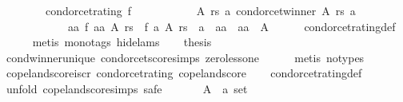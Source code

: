 \begin{isabellebody}
\ \ \ \ \ \ \ \ {\isacharparenleft}{\kern0pt}condorcet{\isacharunderscore}{\kern0pt}rating\ f\ {\isasymlongrightarrow}\isanewline
\ \ \ \ \ \ \ \ \ \ {\isacharparenleft}{\kern0pt}{\isasymforall}A\ rs\ a{\isachardot}{\kern0pt}\ condorcet{\isacharunderscore}{\kern0pt}winner\ A\ rs\ a\ {\isasymlongrightarrow}\isanewline
\ \ \ \ \ \ \ \ \ \ \ \ {\isacharparenleft}{\kern0pt}{\isasymforall}aa{\isachardot}{\kern0pt}\ f\ aa\ A\ rs\ {\isacharless}{\kern0pt}\ f\ a\ A\ rs\ {\isasymor}\ a\ {\isacharequal}{\kern0pt}\ aa\ {\isasymor}\ aa\ {\isasymnotin}\ A{\isacharparenright}{\kern0pt}{\isacharparenright}{\kern0pt}{\isacharparenright}{\kern0pt}{\isachardoublequoteclose}\isanewline
\ \ \ \ \isamarkupfalse%
\ condorcet{\isacharunderscore}{\kern0pt}rating{\isacharunderscore}{\kern0pt}def\isanewline
\ \ \ \ \isamarkupfalse%
\ {\isacharparenleft}{\kern0pt}metis\ {\isacharparenleft}{\kern0pt}mono{\isacharunderscore}{\kern0pt}tags{\isacharcomma}{\kern0pt}\ hide{\isacharunderscore}{\kern0pt}lams{\isacharparenright}{\kern0pt}{\isacharparenright}{\kern0pt}\isanewline
\ \ \isamarkupfalse%
\ {\isacharquery}{\kern0pt}thesis\isanewline
\ \ \ \ \isamarkupfalse%
\ cond{\isacharunderscore}{\kern0pt}winner{\isacharunderscore}{\kern0pt}unique\ condorcet{\isacharunderscore}{\kern0pt}score{\isachardot}{\kern0pt}simps\ zero{\isacharunderscore}{\kern0pt}less{\isacharunderscore}{\kern0pt}one\isanewline
\ \ \ \ \isamarkupfalse%
\ {\isacharparenleft}{\kern0pt}metis\ {\isacharparenleft}{\kern0pt}no{\isacharunderscore}{\kern0pt}types{\isacharparenright}{\kern0pt}{\isacharparenright}{\kern0pt}\isanewline
{}\isamarkupfalse%
%
\endisatagproof
{\isafoldproof}%
%
\isadelimproof
\isanewline
%
\endisadelimproof
\isanewline
\isanewline
{}\isamarkupfalse%
\ copeland{\isacharunderscore}{\kern0pt}score{\isacharunderscore}{\kern0pt}is{\isacharunderscore}{\kern0pt}cr{\isacharcolon}{\kern0pt}\ {\isachardoublequoteopen}condorcet{\isacharunderscore}{\kern0pt}rating\ copeland{\isacharunderscore}{\kern0pt}score{\isachardoublequoteclose}\isanewline
%
\isadelimproof
\ \ %
\endisadelimproof
%
\isatagproof
{}\isamarkupfalse%
\ condorcet{\isacharunderscore}{\kern0pt}rating{\isacharunderscore}{\kern0pt}def\isanewline
{}\isamarkupfalse%
\ {\isacharparenleft}{\kern0pt}unfold\ copeland{\isacharunderscore}{\kern0pt}score{\isachardot}{\kern0pt}simps{\isacharcomma}{\kern0pt}\ safe{\isacharparenright}{\kern0pt}\isanewline
\ \ \isamarkupfalse%
\isanewline
\ \ \ \ A\ {\isacharcolon}{\kern0pt}{\isacharcolon}{\kern0pt}\ {\isachardoublequoteopen}{\isacharprime}{\kern0pt}a\ set{\isachardoublequoteclose}\ \isanewline

\end{isabellebody}
